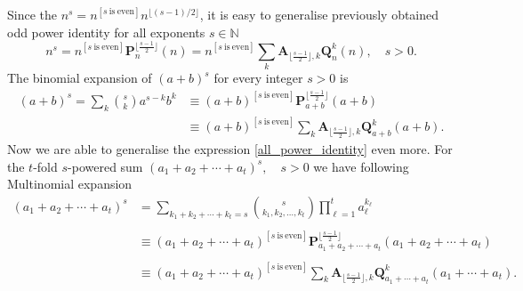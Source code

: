 \documentclass[12pt, letterpaper]{amsart}
\theoremstyle{definition}
\theoremstyle{remark}
\numberwithin{equation}{section}
\begin{document}
Since the $n^s = n^{[s \ \mathrm{is} \ \mathrm{even}]} n^{\lfloor (s-1)/2 \rfloor}$, it is easy to generalise previously obtained odd power identity for all exponents $s\in\mathbb{N}$
\begin{equation}
\label{all_power_identity}
n^s
= n^{[s \ \mathrm{is} \ \mathrm{even}]} \mathbf{P}^{\lfloor \tfrac{s-1}{2} \rfloor}_{n}(n)
= n^{[s \ \mathrm{is} \ \mathrm{even}]}\sum_{k}^{ \ }\mathbf{A}_{\lfloor \tfrac{s-1}{2} \rfloor, k}\mathbf{Q}^{k}_{n}(n), \quad s>0.
\end{equation}
The binomial expansion of $(a+b)^s$ for every integer $s>0$ is
\begin{equation*}
\begin{split}
(a+b)^s=\sum_{k} \binom{s}{k} a^{s-k} b^k
&\equiv(a+b)^{[s \ \mathrm{is} \ \mathrm{even}]} \mathbf{P}^{\lfloor \tfrac{s-1}{2} \rfloor}_{a+b}(a+b) \\
&\equiv(a+b)^{[s \ \mathrm{is} \ \mathrm{even}]}\sum_{k}^{ \ }\mathbf{A}_{\lfloor \tfrac{s-1}{2} \rfloor, k}\mathbf{Q}^{k}_{a+b}(a+b).
\end{split}
\end{equation*}
Now we are able to generalise the expression \eqref{all_power_identity} even more. For the $t$-fold $s$-powered sum $(a_1+a_2+\cdots+a_t)^s, \quad s>0$ we have following Multinomial expansion
\begin{equation*}
\begin{split}
(a_1+a_2+\cdots+a_t)^s
&=\sum_{k_1+k_2+\cdots+k_t=s}\binom{s}{k_1, k_2,\ldots, k_t} \prod_{\ell=1}^{t}a_\ell^{k_\ell}\\
\\
&\equiv (a_1+a_2+\cdots+a_t)^{[s \ \mathrm{is} \ \mathrm{even}]}
\mathbf{P}^{\lfloor \tfrac{s-1}{2} \rfloor}_{a_1+a_2+\cdots+a_t}(a_1+a_2+\cdots+a_t) \\
\\
&\equiv (a_1+a_2+\cdots+a_t)^{[s \ \mathrm{is} \ \mathrm{even}]}
\sum_{k}^{ \ }\mathbf{A}_{\lfloor \tfrac{s-1}{2} \rfloor, k}\mathbf{Q}^{k}_{a_1+\cdots+a_t}(a_1+\cdots+a_t).
\end{split}
\end{equation*}
\end{document}
